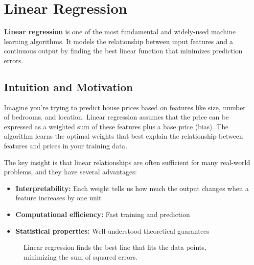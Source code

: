 
\section{Linear Regression}
\label{sec:linear-regression}

\textbf{Linear regression} is one of the most fundamental and widely-used machine learning algorithms. It models the relationship between input features and a continuous output by finding the best linear function that minimizes prediction errors.

\subsection{Intuition and Motivation}

Imagine you're trying to predict house prices based on features like size, number of bedrooms, and location. Linear regression assumes that the price can be expressed as a weighted sum of these features plus a base price (bias). The algorithm learns the optimal weights that best explain the relationship between features and prices in your training data.

The key insight is that linear relationships are often sufficient for many real-world problems, and they have several advantages:
\begin{itemize}
    \item \textbf{Interpretability:} Each weight tells us how much the output changes when a feature increases by one unit
    \item \textbf{Computational efficiency:} Fast training and prediction
    \item \textbf{Statistical properties:} Well-understood theoretical guarantees
\end{itemize}

\begin{figure}[htbp]
\centering
{}
\caption{Linear regression finds the best line that fits the data points, minimizing the sum of squared errors.}
\label{fig:linear-regression-example}
\end{figure}

